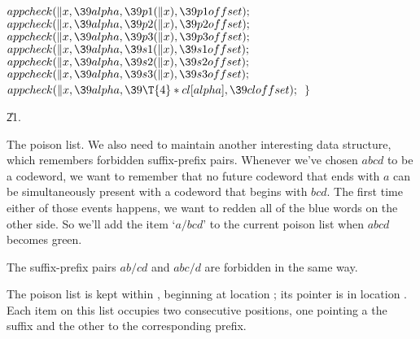 ${}\\{appcheck}(\|x,\39\\{alpha},\39\\{p1}(\|x),\39\\{p1offset});{}$\6
${}\\{appcheck}(\|x,\39\\{alpha},\39\\{p2}(\|x),\39\\{p2offset});{}$\6
${}\\{appcheck}(\|x,\39\\{alpha},\39\\{p3}(\|x),\39\\{p3offset});{}$\6
${}\\{appcheck}(\|x,\39\\{alpha},\39\\{s1}(\|x),\39\\{s1offset});{}$\6
${}\\{appcheck}(\|x,\39\\{alpha},\39\\{s2}(\|x),\39\\{s2offset});{}$\6
${}\\{appcheck}(\|x,\39\\{alpha},\39\\{s3}(\|x),\39\\{s3offset});{}$\6
${}\\{appcheck}(\|x,\39\\{alpha},\39\T{4}*\\{cl}[\\{alpha}],\39%
\\{cloffset});{}$\6
\4${}\}{}$\2\2\par
\U21.\fi

The poison list. We also need to maintain
another interesting data
structure, which remembers forbidden suffix-prefix pairs. Whenever
we've chosen $abcd$ to be a codeword, we want to remember that
no future codeword that ends with $a$ can be simultaneously present
with a codeword that begins with $bcd$. The first time either of those
events happens, we want to redden all of the blue words on the other side.
So we'll add the item `$a/bcd$' to the current poison list when $abcd$ becomes
green.

The suffix-prefix pairs $ab/cd$ and $abc/d$ are forbidden in the same way.

The poison list is kept within , beginning at location ;
its pointer is in  location . Each item on
this list occupies
two consecutive  positions, one pointing a the suffix and the other
to the corresponding prefix.

